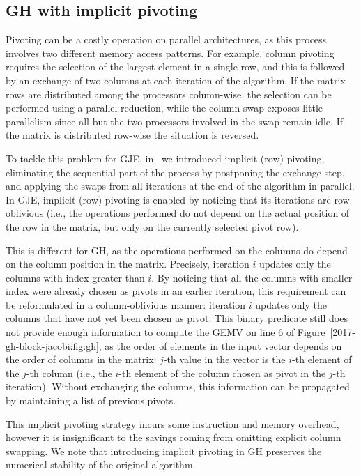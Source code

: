 \subsection{GH with implicit pivoting}
Pivoting can be a costly operation on parallel architectures,
as this process involves two different memory access patterns.
For example, column pivoting requires the selection of the largest element in a single row,
and this is followed by an exchange of two columns at each iteration of the algorithm.
If the matrix rows are distributed among the processors column-wise,
the selection can be performed using a parallel reduction,
while the column swap exposes little parallelism
since all but the two processors involved in the swap remain idle.
If the matrix is distributed row-wise the situation is reversed.

To tackle this problem for GJE,
in~\cite{gje}
we introduced implicit (row) pivoting,
eliminating the sequential part of the process by postponing the
exchange step, and applying the swaps from all iterations
at the end of the algorithm in parallel.
In GJE, implicit (row) pivoting is enabled by noticing that its iterations are row-oblivious
(i.e., the operations performed do not depend on the actual position of the row in the matrix,
but only on the currently selected pivot row).

This is different for GH,
as the operations performed on the columns do depend on the column position in the matrix.
Precisely, iteration $i$ updates only the columns with index greater than $i$.
By noticing that all the columns with smaller index were already chosen as pivots
in an earlier iteration, this requirement can be reformulated in a column-oblivious manner:
iteration $i$ updates only the columns that have not yet been chosen as pivot.
This binary predicate still does not provide enough information to compute the GEMV 
on line 6 of Figure~\ref{2017-gh-block-jacobi:fig:gh},
as the order of elements in the input vector depends on the order of columns in the matrix:
$j$-th value in the vector is the $i$-th element of the $j$-th column (i.e.,
the $i$-th element of the column chosen as pivot in the $j$-th iteration).
Without exchanging the columns, this information can be propagated 
by maintaining a list of previous pivots.

This implicit pivoting strategy incurs some instruction and memory overhead,
however it is insignificant to the savings coming from omitting explicit column swapping.
We note that introducing implicit pivoting in GH
preserves the numerical stability of the original algorithm.

